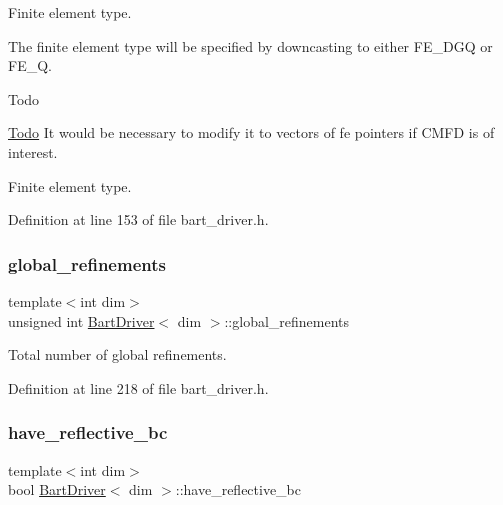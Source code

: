 Finite element type. 

The finite element type will be specified by downcasting to either F\+E\+\_\+\+D\+GQ or F\+E\+\_\+Q.

\begin{DoxyRefDesc}{Todo}
\item[\hyperlink{todo__todo000001}{Todo}]It would be necessary to modify it to vectors of fe pointers if C\+M\+FD is of interest. \end{DoxyRefDesc}
Finite element type. 

Definition at line 153 of file bart\+\_\+driver.\+h.

\mbox{\label{class_bart_driver_a1ddb881c78ef92c59f2c686b320c970e}} 
\subsubsection{\texorpdfstring{global\+\_\+refinements}{global\_refinements}}
{\footnotesize\ttfamily template$<$int dim$>$ \\
unsigned int \hyperlink{class_bart_driver}{Bart\+Driver}$<$ dim $>$\+::global\+\_\+refinements\hspace{0.3cm}{\ttfamily [private]}}



Total number of global refinements. 



Definition at line 218 of file bart\+\_\+driver.\+h.

\mbox{\label{class_bart_driver_ad42739169c4b4b97014c53a616f2d1ee}} 
\subsubsection{\texorpdfstring{have\+\_\+reflective\+\_\+bc}{have\_reflective\_bc}}
{\footnotesize\ttfamily template$<$int dim$>$ \\
bool \hyperlink{class_bart_driver}{Bart\+Driver}$<$ dim $>$\+::have\+\_\+reflective\+\_\+bc\hspace{0.3cm}{\ttfamily [private]}}




